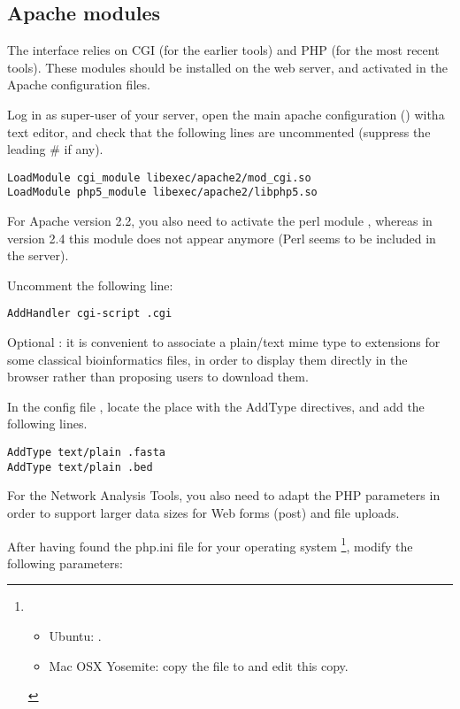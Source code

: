 \documentclass[12pt,a4paper, twoside]{scrreprt} %
\begin{document}
\subsection{Apache modules}

The \RSAT interface relies on CGI (for the earlier tools) and PHP (for
the most recent tools). These modules should be installed on the web
server, and activated in the Apache configuration files. 

Log in as super-user of your server, open the main apache
configuration () witha text editor, and
check that the following lines are uncommented (suppress the leading
\# if any).

\begin{lstlisting}
LoadModule cgi_module libexec/apache2/mod_cgi.so
LoadModule php5_module libexec/apache2/libphp5.so
\end{lstlisting}
                                                        
For Apache version 2.2, you also need to activate the perl module
, whereas in version 2.4 this module does not
appear anymore (Perl seems to be included in the server).

Uncomment the following line:

\begin{lstlisting}
AddHandler cgi-script .cgi
\end{lstlisting}

Optional : it is convenient to associate a plain/text mime type to
extensions for some classical bioinformatics files, in order to
display them directly in the browser rather than proposing users to
download them.

In the config file , locate the place with the AddType
directives, and add the following lines.

\begin{lstlisting}
AddType text/plain .fasta
AddType text/plain .bed
\end{lstlisting}

For the Network Analysis Tools, you also need to adapt the PHP
parameters in order to support larger data sizes for Web forms (post)
and file uploads.


After having found the php.ini file for your operating
system \footnote{
  \begin{itemize}
  \item Ubuntu:  .
  \item Mac OSX Yosemite: copy the file  to
     and edit this copy.
  \end{itemize}
}, modify the following parameters:
\end{document}
